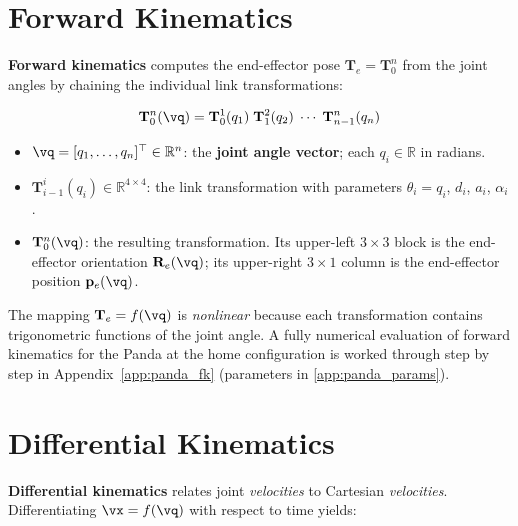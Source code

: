 \section{Forward Kinematics}
\label{sec:fk}

\textbf{Forward kinematics} computes the end-effector pose
$\mathbf{T}_e=\mathbf{T}_0^n$ from the joint angles by chaining the
individual link transformations:

\begin{equation}
\label{eq:fk}
\mathbf{T}_{0}^{n}(\vq) =
\mathbf{T}_{0}^{1}(q_1)\;
\mathbf{T}_{1}^{2}(q_2)\;
\cdots\;
\mathbf{T}_{n-1}^{n}(q_n)
\end{equation}

\begin{itemize}
  \item $\vq=[q_1,\ldots,q_n]^\top\in\mathbb{R}^n$: the
        \textbf{joint angle vector}; each $q_i\in\mathbb{R}$ in radians.
  \item $\mathbf{T}_{i-1}^{i}(q_i)\in\mathbb{R}^{4\times4}$:
        the  link transformation with parameters
        $\theta_i=q_i$, $d_i$, $a_i$, $\alpha_i$ \cite{Denavit1955}.
  \item $\mathbf{T}_{0}^{n}(\vq)$: the resulting transformation.
        Its upper-left $3\times3$ block is the end-effector
        orientation $\mathbf{R}_e(\vq)$; its upper-right $3\times1$
        column is the end-effector position $\mathbf{p}_e(\vq)$.
\end{itemize}

The mapping $\mathbf{T}_e=f(\vq)$ is \emph{nonlinear} because each
 transformation contains trigonometric functions of the joint angle.
A fully numerical evaluation of forward kinematics for the Panda at the
home configuration is worked through step by step in
Appendix~\ref{app:panda_fk} (parameters in \cref{app:panda_params}).

\section{Differential Kinematics}
\label{sec:dk}

\textbf{Differential kinematics} relates joint \emph{velocities} to
Cartesian \emph{velocities}.
Differentiating $\vx=f(\vq)$ with respect to time yields:


